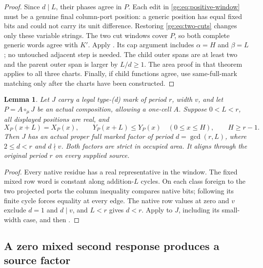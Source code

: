 \documentclass[11pt,a4paper]{amsart}
\numberwithin{equation}{section}
\theoremstyle{plain}
\newtheorem{lemma}[theorem]{Lemma}
\theoremstyle{definition}
\begin{document}
\begin{proof}
Since \(d\mid L\), their phases agree in \(P\).  Each edit in
\eqref{ge:eq:positive-window} must be a genuine final column-port
position: a generic position has equal fixed bits and could not carry
its unit difference.  Restoring \eqref{ge:eq:two-cuts} changes only these
variable strings.  The two cut windows cover \(P\), so both complete
generic words agree with \(K'\).  Apply \cite[Recovery from the generic words]{Shields2026Gluing}.  Its cap
argument includes \(\alpha=H\) and \(\beta=L\); no untouched adjacent
step is needed.  The child outer spans are at least two and the parent
outer span is larger by \(L/d\ge1\).  The area proof in that theorem
applies to all three charts.  Finally, if child functions agree, use
same-full-mark matching only after the charts have been constructed.
\end{proof}

\begin{lemma}\label{ge:literal-mixed}
Let \(J\) carry a legal type-(d) mark of period \(r\), width \(v\),
and let \(P=A\circ_\mu J\) be an actual composition, allowing a
one-cell \(A\).  Suppose \(0<L<r\), all displayed positions are real,
and
\[
 X_P(x+L)=X_P(x),\qquad Y_P(x+L)\le Y_P(x)
 \quad(0\le x\le H),\qquad H\ge r-1.
\]
Then \(J\) has an actual proper full marked factor of period
\(d=\gcd(r,L)\), where \(2\le d<r\) and \(d\nmid v\).
Both factors are strict in occupied area.  It aligns through the original
period \(r\) on every supplied source.
\end{lemma}
\begin{proof}
Every native residue has a real representative in the window.  The fixed
mixed row word is constant along addition-\(L\) cycles.  On each class
foreign to the two projected ports the column inequality compares native
bits; following its finite cycle forces equality at every edge.  The
native row values at zero and \(v\) exclude \(d=1\) and \(d\mid v\),
and \(L<r\) gives \(d<r\).  Apply \cite[Mixed residue fold]{Shields2026Gluing} to \(J\),
including its small-width case, and then .
\end{proof}
\subsection{A zero mixed second response produces a source factor}
\end{document}
